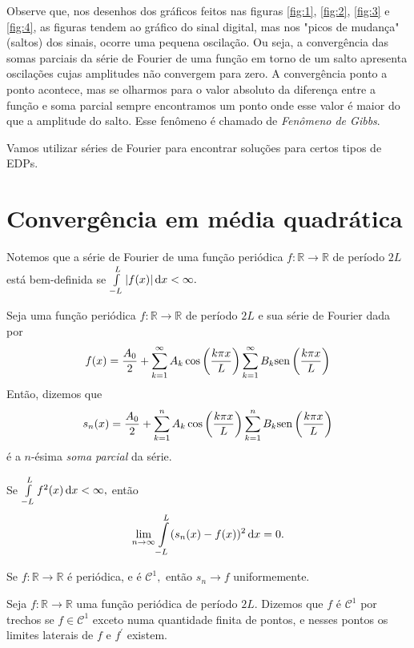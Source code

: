 \documentclass[11pt,twoside,a4paper]{book}
\begin{document}
Observe que, nos desenhos dos gráficos feitos nas figuras \ref{fig:1}, \ref{fig:2}, \ref{fig:3} e \ref{fig:4}, as figuras tendem ao gráfico do sinal digital, mas nos "picos de mudança" (saltos) dos sinais, ocorre uma pequena oscilação. Ou seja, a convergência das somas parciais da série de Fourier de uma função em torno de um salto apresenta oscilações cujas amplitudes não convergem para zero. A convergência ponto a ponto acontece, mas se olharmos para o valor absoluto da diferença entre a função e soma parcial sempre encontramos um ponto onde esse valor é maior do que a amplitude do salto. Esse fenômeno é chamado de \emph{Fenômeno de Gibbs}.


Vamos utilizar séries de Fourier para encontrar soluções para certos tipos de EDPs.


\section{Convergência em média quadrática}
Notemos que a série de Fourier de uma função periódica $f \colon \mathbb{R} \to \mathbb{R}$ de período $2 L$ está bem-definida se $\int\limits_{-L}^L | f(x) | \dif x < \infty.$
\begin{definicao}
Seja uma função periódica $f \colon \mathbb{R} \to \mathbb{R}$ de período $2 L$ e sua série de Fourier dada por
\[f(x) = \frac{A_0}{2} + \sum\limits_{k = 1}^\infty A_k \cos \left( \frac{k \pi x}{L} \right) \sum\limits_{k = 1}^\infty B_k {\rm sen} \left( \frac{k \pi x}{L} \right)\]
Então, dizemos que 
\[
s_n(x) = \frac{A_0}{2} + \sum\limits_{k = 1}^n A_k \cos \left( \frac{k \pi x}{L} \right) \sum\limits_{k = 1}^n B_k {\rm sen} \left( \frac{k \pi x}{L} \right)
\]
é a $n$-ésima \emph{soma parcial} da série.
\end{definicao}
\begin{teorema}
Se $\int\limits_{-L}^{L} f^2 (x) \dif x < \infty,$ então
\[
\lim\limits_{n \to \infty} \int\limits_{-L}^{L} (s_n(x) - f(x))^2 \dif x = 0.
\]

\end{teorema}

\begin{teorema}
Se $f \colon \mathbb{R} \to \mathbb{R}$ é periódica, e é $\mathcal{C}^1,$ então $s_n \to f$ uniformemente.
\end{teorema}

\begin{definicao}
Seja $f \colon \mathbb{R} \to \mathbb{R}$ uma função periódica de período $2L.$ Dizemos que $f$ é $\mathcal{C}^1$ por trechos se $f \in \mathcal{C}^1$ exceto numa quantidade finita de pontos, e nesses pontos os limites laterais de $f$ e $f^\prime$ existem.
\end{definicao}
\end{document}
